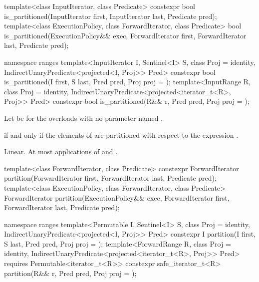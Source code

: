 %
\begin{itemdecl}
template<class InputIterator, class Predicate>
  constexpr bool is_partitioned(InputIterator first, InputIterator last, Predicate pred);
template<class ExecutionPolicy, class ForwardIterator, class Predicate>
  bool is_partitioned(ExecutionPolicy&& exec,
                      ForwardIterator first, ForwardIterator last, Predicate pred);

namespace ranges {
  template<InputIterator I, Sentinel<I> S, class Proj = identity,
      IndirectUnaryPredicate<projected<I, Proj>> Pred>
    constexpr bool is_partitioned(I first, S last, Pred pred, Proj proj = {});
  template<InputRange R, class Proj = identity,
      IndirectUnaryPredicate<projected<iterator_t<R>, Proj>> Pred>
    constexpr bool is_partitioned(R&& r, Pred pred, Proj proj = {});
}
\end{itemdecl}

\begin{itemdescr}
\pnum
Let  be  for
the overloads with no parameter named .

\pnum
\returns {} if and only if
the elements  of
 are partitioned with respect to the expression
.

\pnum
\complexity Linear. At most  applications of 
and .
\end{itemdescr}

%
\begin{itemdecl}
template<class ForwardIterator, class Predicate>
  constexpr ForwardIterator
    partition(ForwardIterator first, ForwardIterator last, Predicate pred);
template<class ExecutionPolicy, class ForwardIterator, class Predicate>
  ForwardIterator
    partition(ExecutionPolicy&& exec,
              ForwardIterator first, ForwardIterator last, Predicate pred);

namespace ranges {
  template<Permutable I, Sentinel<I> S, class Proj = identity,
      IndirectUnaryPredicate<projected<I, Proj>> Pred>
    constexpr I
      partition(I first, S last, Pred pred, Proj proj = {});
  template<ForwardRange R, class Proj = identity,
      IndirectUnaryPredicate<projected<iterator_t<R>, Proj>> Pred>
    requires Permutable<iterator_t<R>>
    constexpr safe_iterator_t<R>
      partition(R&& r, Pred pred, Proj proj = {});
}
\end{itemdecl}

